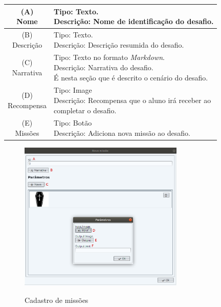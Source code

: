 \documentclass[
	12pt,				%
	oneside,			%
	a4paper,			%
	english,			%
	french,				%
	spanish,			%
	brazil,				%
	]{abntex2}
\begin{document}
\begin{table}[H]
\centering
{} \label{tab:manutencaoDesafios}
\renewcommand{\arraystretch}{1.8}
\setlength{\tabcolsep}{10pt}
\begin{tabular}{|c|l|}
  \hline
  \makecell{(A) \\ Nome} 
  &
  \makecell[l]{Tipo: Texto. \\  Descrição: Nome de identificação do desafio.} \\
  \hline
  \makecell{(B) \\ Descrição} 
  &
  \makecell[l]{Tipo: Texto.\\ Descrição: Descrição resumida do desafio.} \\
  \hline
  \makecell{(C) \\ Narrativa} 
  &
  \makecell[l]{Tipo: Texto no formato \textit{Markdown}.\\ Descrição: Narrativa do desafio. 
  \\ É nesta seção que é descrito o cenário do desafio.} \\
  \hline
  \makecell{(D) \\ Recompensa} 
  &
  \makecell[l]{Tipo: Image \\ Descrição: Recompensa que o aluno irá receber ao \\ completar o desafio.} \\
  \hline
  \makecell{(E) \\ Missões} 
  &
  \makecell[l]{Tipo: Botão \\ Descrição: Adiciona nova missão ao desafio.} \\
  \hline  
\end{tabular}
\centering
\sourceAuthor
\end{table}

\begin{figure}[H]
\centering
\caption{Cadastro de missões}
\includegraphics[width=0.7\textwidth]{imagens/visnode_cadastro_missao.png}
\sourceAuthor
\label{fig:visnodeCadastroMissoes}
\end{figure}
\end{document}
